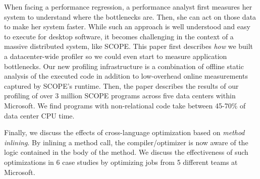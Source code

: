 


When facing a performance regression, a performance analyst first measures her system to understand where the bottlenecks are.  Then, she can act on those data to make her system faster.  While such an approach is well understood and easy to execute for desktop software, it becomes challenging in the context of a massive distributed system, like SCOPE.
This paper first describes \emph{how} we built a datacenter-wide profiler so we could even start to measure application bottlenecks.
Our new profiling infrastructure is a combination of offline static analysis of the executed code in addition to low-overhead online measurements captured by SCOPE's runtime.
Then, the paper describes the results of our profiling of over 3 million SCOPE programs across five data centers within Microsoft.
We find programs with non-relational code take between 45-70\% of data center CPU time.  

Finally, we discuss the effects of cross-language optimization based on \emph{method inlining}. 
By inlining a method call, the compiler/optimizer is now aware of the logic contained in the body of the method. 
We discuss the effectiveness of such optimizations in 6 case studies by optimizing jobs from 5 different teams at Microsoft. 



